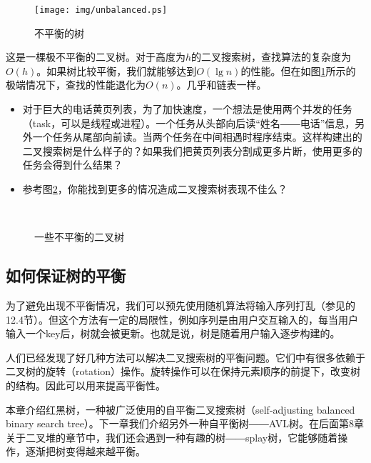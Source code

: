\documentclass{ctexart}
\begin{document}
\begin{figure}[htbp]
    \centering
	\texttt{[image: img/unbalanced.ps]}
    \caption{不平衡的树} \label{fig:unbalanced-tree}
\end{figure}

这是一棵极不平衡的二叉树。对于高度为$h$的二叉搜索树，查找算法的复杂度为$O(h)$。如果树比较平衡，我们就能够达到$O(\lg n)$的性能。但在如图\ref{fig:unbalanced-tree}所示的极端情况下，查找的性能退化为$O(n)$。几乎和链表一样。

\begin{Exercise}

\begin{itemize}
\item 对于巨大的电话黄页列表，为了加快速度，一个想法是使用两个并发的任务（task，可以是线程或进程）。一个任务从头部向后读“姓名――电话”信息，另外一个任务从尾部向前读。当两个任务在中间相遇时程序结束。这样构建出的二叉搜索树是什么样子的？如果我们把黄页列表分割成更多片断，使用更多的任务会得到什么结果？
\item 参考图\ref{fig:unbalanced-trees}，你能找到更多的情况造成二叉搜索树表现不佳么？
\end{itemize}

\end{Exercise}

\begin{figure}[htbp]
       \centering
        \\
       \caption{一些不平衡的二叉树}
       \label{fig:unbalanced-trees}
\end{figure}

\subsection{如何保证树的平衡}

为了避免出现不平衡情况，我们可以预先使用随机算法将输入序列打乱（参见\cite{CLRS}的12.4节）。但这个方法有一定的局限性，例如序列是由用户交互输入的，每当用户输入一个key后，树就会被更新。也就是说，树是随着用户输入逐步构建的。

人们已经发现了好几种方法可以解决二叉搜索树的平衡问题。它们中有很多依赖于二叉树的旋转（rotation）操作。旋转操作可以在保持元素顺序的前提下，改变树的结构。因此可以用来提高平衡性。

本章介绍红黑树，一种被广泛使用的自平衡二叉搜索树（self-adjusting balanced binary search tree）。下一章我们介绍另外一种自平衡树――AVL树。在后面第8章关于二叉堆的章节中，我们还会遇到一种有趣的树――splay树，它能够随着操作，逐渐把树变得越来越平衡。
\end{document}
